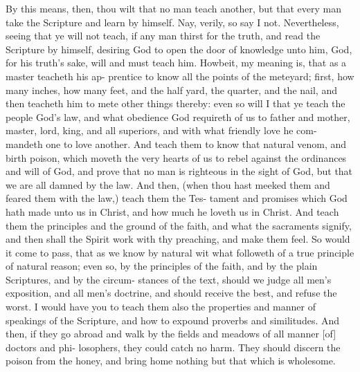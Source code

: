 \documentclass{custom}
\begin{document}
By this means, then, thou wilt that no man 
teach another, but that every man take the 
Scripture and learn by himself. Nay, verily, so 
say I not. Nevertheless, seeing that ye will not 
teach, if any man thirst for the truth, and read 
the Scripture by himself, desiring God to open 
the door of knowledge unto him, God, for his 
truth's sake, will and must teach him. Howbeit, 
my meaning is, that as a master teacheth his ap- 
prentice to know all the points of the meteyard; 
first, how many inches, how many feet, and the 
half yard, the quarter, and the nail, and then 
teacheth him to mete other things thereby: even 
so will I that ye teach the people God's law, 
and what obedience God requireth of us to 
father and mother, master, lord, king, and all 
superiors, and with what friendly love he com- 
mandeth one to love another. And teach them 
to know that natural venom, and birth poison, 
which moveth the very hearts of us to rebel 
against the ordinances and will of God, and 
prove that no man is righteous in the sight of 
God, but that we are all damned by the law. 
And then, (when thou hast meeked them and 
feared them with the law,) teach them the Tes- 
tament and promises which God hath made unto 
us in Christ, and how much he loveth us in 
Christ. And teach them the principles and the 
ground of the faith, and what the sacraments 
signify, and then shall the Spirit work with thy 
preaching, and make them feel. So would it 
come to pass, that as we know by natural wit 
what followeth of a true principle of natural 
reason; even so, by the principles of the faith, 
and by the plain Scriptures, and by the circum- 
stances of the text, should we judge all men's 
exposition, and all men's doctrine, and should 
receive the best, and refuse the worst. I would 
have you to teach them also the properties and 
manner of speakings of the Scripture, and how 
to expound proverbs and similitudes. And 
then, if they go abroad and walk by the fields 
and meadows of all manner [of] doctors and phi- 
losophers, they could catch no harm. They 
should discern the poison from the honey, and 
bring home nothing but that which is wholesome. 
\end{document}
